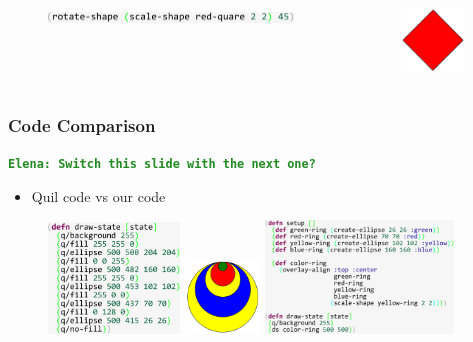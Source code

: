 \documentclass{beamer}
\newcommand{\comment}[1]{{\bf \tt  {#1}}}
\newcommand{\emcomment}[1]{\textcolor{ForestGreen}{\comment{Elena: {#1}}}}
\begin{document}
\begin{frame}[fragile]
\begin{itemize}
		\begin{columns}[t]
		\begin{column}{.45\textwidth}
			\begin{figure}[h]
			\vspace{-0.5cm}
			\includegraphics[width=6.5cm]{PresentationImages/rotateAndScaleRedCode.pdf}
			\end{figure}
		\end{column}
		\begin{column}{.3\textwidth}
			\begin{figure}[h]
			\includegraphics[width=1.7cm]{PresentationImages/red-rectangle-scale-rotate.png}
			\end{figure}		
		\end{column}
		\end{columns}
	\end{itemize}
\end{frame}

\begin{frame}
\frametitle{Code Comparison}
\emcomment{Switch this slide with the next one?}
	\begin{itemize}
		\item Quil code vs our code 
	\end{itemize}
	\begin{figure}
	\hspace{-0.4cm}
	\includegraphics[width=3.5cm]{PresentationImages/theirRingsCode.pdf}
	\hspace{0.1cm}
	\includegraphics[width=2cm]{PresentationImages/rings.png}
	\hspace{0.1cm}
	\includegraphics[width=5cm]{PresentationImages/ourRingsCode.pdf}
	\end{figure}
\end{frame}
\end{document}
